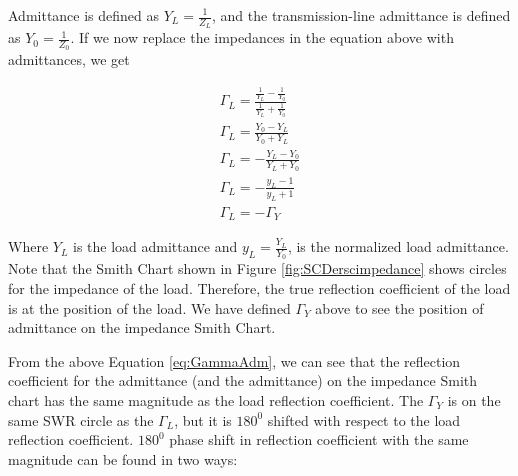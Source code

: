 \documentclass{ximera}
\begin{document}
Admittance is defined as $Y_L=\frac{1}{Z_L}$, and the transmission-line admittance is defined as $Y_0=\frac{1}{Z_0}$. If we now replace the impedances in the equation above with admittances, we get


\begin{eqnarray}
\Gamma_L = \frac{\frac{1}{Y_L}-\frac{1}{Y_0}}{\frac{1}{Y_L}+\frac{1}{Y_0}} \\
\Gamma_L = \frac{Y_0-Y_L}{Y_0+Y_L} \\
\Gamma_L = -  \frac{Y_L-Y_0}{Y_L+Y_0} \\
\Gamma_L = -  \frac{y_L-1}{y_L+1} \\
\Gamma_L = -\Gamma_Y \label{eq:GammaAdm}
\end{eqnarray}


Where $Y_L$ is the load admittance and $y_L=\frac{Y_L}{Y_0} $, is the normalized load admittance. Note that the Smith Chart shown in Figure \ref{fig:SCDerscimpedance} shows circles for the impedance of the load. Therefore, the true reflection coefficient of the load is at the position of the load. We have defined $\Gamma_Y $ above to see the position of admittance on the impedance Smith Chart. 


 From the above Equation \ref{eq:GammaAdm}, we can see that the reflection coefficient for the admittance (and the admittance) on the impedance Smith chart has the same magnitude as the load reflection coefficient. The $\Gamma_Y$ is on the same SWR circle as the $\Gamma_L$, but it is $180^0$ shifted with respect to the load reflection coefficient. $180^0$ phase shift in reflection coefficient with the same magnitude can be found in two ways:
 
\end{document}
